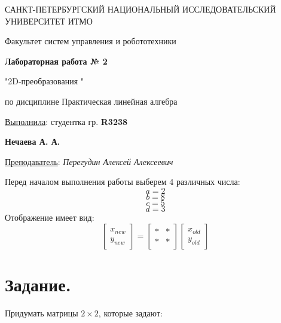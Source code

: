 \documentclass[a5paper, 10pt]{article}
\theoremstyle{definition}
\theoremstyle{plain}
\theoremstyle{remark}
\newcommand*{\titlePage}{
	\thispagestyle{title}
	\begingroup
	\begin{center}
		\vspace*{6ex}
		
		{\small
			САНКТ-ПЕТЕРБУРГСКИЙ НАЦИОНАЛЬНЫЙ ИССЛЕДОВАТЕЛЬСКИЙ УНИВЕРСИТЕТ ИТМО	
		}
		
		\vspace*{2ex}
		
		{\normalsize
			Факультет систем управления и робототехники
		}
		
		\vspace*{15ex}
		
		{\Large \bfseries 
			Лабораторная работа № 2
		}
\vspace*{2ex}
	{\Large \bfseries 
			
"2D-преобразования "
		}
\vspace*{2ex}
		
		{\normalsize
			по дисциплине Практическая линейная алгебра
		}

	\end{center}
	\vspace*{20ex}
	\begin{flushright}
		{\large 
			\underline{Выполнила}: студентка гр. \textbf{R3238}\\
			\begin{flushright}
				\textbf{Нечаева А. А.}\\
			\end{flushright}
		}
		
		\vspace*{5ex}
		
		{\large 
			\underline{Преподаватель}: \textit{Перегудин Алексей Алексеевич}
		}
	\end{flushright}	
	\newpage
	\setcounter{page}{1}
	\endgroup}
\begin{document}
	\titlePage
	\pagestyle{style}
\newpage

Перед началом выполнения работы выберем 4 различных числа: $$a = 2$$ $$b = 8$$ $$c = 5$$ $$d=3$$
Отображение имеет вид:
\begin{equation}
\begin{bmatrix}
x_{new}\\
y_{new}
\end{bmatrix}
=
\begin{bmatrix}
* & *\\
* & *
\end{bmatrix}
\begin{bmatrix}
x_{old}\\
y_{old}
\end{bmatrix}
\end{equation}


\section{Задание.}
 Придумать матрицы $2 \times 2$, которые задают:
\end{document}
